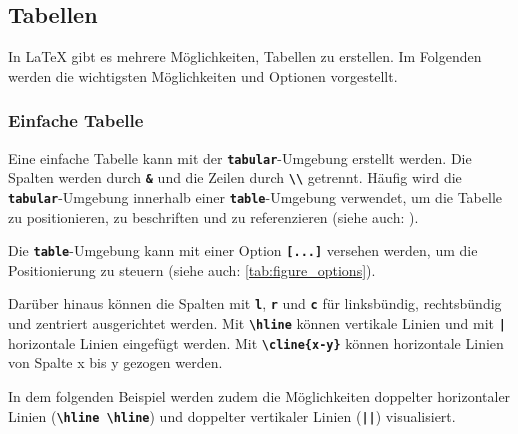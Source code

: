 \newpage

\subsection{Tabellen}

In \LaTeX{} gibt es mehrere Möglichkeiten, Tabellen zu erstellen. Im Folgenden werden die wichtigsten Möglichkeiten und Optionen vorgestellt.

\subsubsection{Einfache Tabelle}
Eine einfache Tabelle kann mit der \textbf{\texttt{tabular}}-Umgebung erstellt werden. Die Spalten werden durch \textbf{\texttt{\&}} und die Zeilen durch \textbf{\texttt{\textbackslash\textbackslash}} getrennt. Häufig wird die \textbf{\texttt{tabular}}-Umgebung innerhalb einer \textbf{\texttt{table}}-Umgebung verwendet, um die Tabelle zu positionieren, zu beschriften und zu referenzieren (siehe auch: ).

Die \textbf{\texttt{table}}-Umgebung kann mit einer Option \textbf{\texttt{[...]}} versehen werden, um die Positionierung zu steuern (siehe auch: \autoref{tab:figure_options}).

Darüber hinaus können die Spalten mit \textbf{\texttt{l}}, \textbf{\texttt{r}} und \textbf{\texttt{c}} für linksbündig, rechtsbündig und zentriert ausgerichtet werden. Mit \textbf{\texttt{\textbackslash hline}} können vertikale Linien und mit \textbf{\texttt{|}} horizontale Linien eingefügt werden.
Mit \textbf{\texttt{\textbackslash cline\{x-y\}}} können horizontale Linien von Spalte x bis y gezogen werden.

In dem folgenden Beispiel werden zudem die Möglichkeiten doppelter horizontaler Linien (\textbf{\texttt{\textbackslash hline \textbackslash hline}}) und doppelter vertikaler Linien (\textbf{\texttt{||}}) visualisiert.

